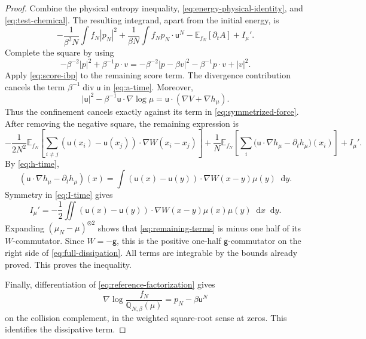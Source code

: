 \documentclass[11pt,reqno]{amsart}
\numberwithin{equation}{section}
\theoremstyle{definition}
\theoremstyle{remark}
\newcommand{\E}{\mathbb E}
\newcommand{\g}{\mathsf g}
\newcommand{\Q}{\mathbb Q}
\renewcommand{\u}{\mathsf u}
\newcommand{\diver}{\operatorname{div}}
\newcommand{\dd}{\mathop{}\!\mathrm d}
\begin{document}
\begin{proof}
Combine the physical entropy inequality, \eqref{eq:energy-physical-identity}, and \eqref{eq:test-chemical}. The resulting integrand, apart from the initial energy, is
\begin{equation}\label{eq:before-square}
 -\frac1{\beta^2N}\int f_N|p_N|^2
 +\frac1{\beta N}\int f_Np_N\cdot \u^N
       -\E_{f_N}[\partial_t A]+I_\mu'.
\end{equation}
Complete the square by using
\begin{equation}\label{eq:complete-square}
 -\beta^{-2}|p|^2+\beta^{-1}p\cdot v
 =-\beta^{-2}|p-\beta v|^2-\beta^{-1}p\cdot v+|v|^2.
\end{equation}
Apply \eqref{eq:score-ibp} to the remaining score term. The divergence contribution cancels the term $\beta^{-1}\diver \u$ in \eqref{eq:a-time}. Moreover,
\begin{equation}\label{eq:confinement-cancel}
 |\u|^2-\beta^{-1}\u\cdot\nabla\log\mu
 =\u\cdot(\nabla V+\nabla h_\mu).
\end{equation}
Thus the confinement cancels exactly against its term in \eqref{eq:symmetrized-force}. After removing the negative square, the remaining expression is
\begin{equation}\label{eq:remaining-terms}
 -\frac1{2N^2}\E_{f_N}\!\left[\sum_{i\ne j}
        (\u(x_i)-\u(x_j))\cdot\nabla W(x_i-x_j)\right]
 +\frac1N\E_{f_N}\!\left[\sum_i\bigl(\u\cdot\nabla h_\mu-\partial_t h_\mu\bigr)(x_i)\right]
 +I_\mu'.
\end{equation}
By \eqref{eq:h-time},
\begin{equation}\label{eq:cross-cancel}
 (\u\cdot\nabla h_\mu-\partial_t h_\mu)(x)
 =\int(\u(x)-\u(y))\cdot\nabla W(x-y)\mu(y)\dd y.
\end{equation}
Symmetry in \eqref{eq:I-time} gives
\begin{equation}\label{eq:continuum-cancel}
 I_\mu'=-\frac12\iint(\u(x)-\u(y))\cdot\nabla W(x-y)
                     \mu(x)\mu(y)\dd x\dd y.
\end{equation}
Expanding $(\mu_N-\mu)^{\otimes2}$ shows that \eqref{eq:remaining-terms} is minus one half of its $W$-commutator. Since $W=-\g$, this is the positive one-half $\g$-commutator on the right side of \eqref{eq:full-dissipation}. All terms are integrable by the bounds already proved. This proves the inequality.

Finally, differentiation of \eqref{eq:reference-factorization} gives
\begin{equation}\label{eq:modulated-score}
 \nabla\log\frac{f_N}{\Q_{N,\beta}(\mu)}=p_N-\beta \u^N
\end{equation}
on the collision complement, in the weighted square-root sense at zeros. This identifies the dissipative term.
\end{proof}
\end{document}
